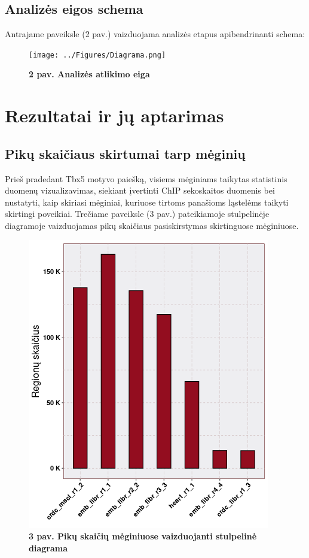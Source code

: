 \documentclass[12pt]{article}
\begin{document}
\subsection{Analizės eigos schema}
Antrajame paveiksle (2 pav.) vaizduojama analizės etapus apibendrinanti schema:
\begin{figure}[htb]
    \begin{center}
        \texttt{[image: ../Figures/Diagrama.png]}
        \vspace{-2\baselineskip}
        \caption*{\small\textbf{2 pav. Analizės atlikimo eiga}}
    \end{center}
\end{figure}

\newpage



\section{Rezultatai ir jų aptarimas}
\subsection{Pikų skaičiaus skirtumai tarp mėginių}
Prieš pradedant Tbx5 motyvo paiešką, visiems mėginiams taikytas statistinis
duomenų vizualizavimas, siekiant įvertinti ChIP sekoskaitos duomenis bei
nustatyti, kaip skiriasi mėginiai, kuriuose tirtoms panašioms ląstelėms
taikyti skirtingi poveikiai.
Trečiame paveiksle (3 pav.) pateikiamoje stulpelinėje diagramoje vaizduojamas
pikų skaičiaus pasiskirstymas skirtinguose mėginiuose.

\begin{figure}[htb]
    \begin{center}
        \includegraphics[width=0.5\linewidth]{../Figures/total_peak_counts.png}
        \vspace{-2\baselineskip}
        \caption*{\small\textbf{3 pav. Pikų skaičių mėginiuose vaizduojanti
                                stulpelinė diagrama}}
    \end{center}
\end{figure}
\end{document}
